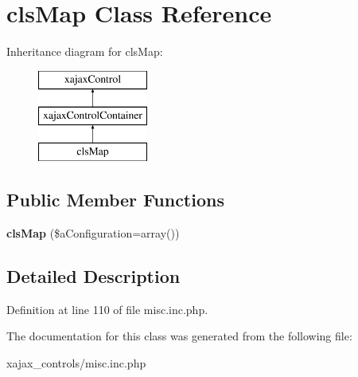 \hypertarget{classclsMap}{
\section{clsMap Class Reference}
\label{classclsMap}
}
Inheritance diagram for clsMap:\begin{figure}[H]
\begin{center}
\leavevmode
\includegraphics[height=3.000000cm]{classclsMap}
\end{center}
\end{figure}
\subsection*{Public Member Functions}
\begin{DoxyCompactItemize}
\item 
\hypertarget{classclsMap_ab8c244900e01a852ff254b9c4e9d0a10}{
{\bfseries clsMap} (\$aConfiguration=array())}
\label{classclsMap_ab8c244900e01a852ff254b9c4e9d0a10}

\end{DoxyCompactItemize}


\subsection{Detailed Description}


Definition at line 110 of file misc.inc.php.



The documentation for this class was generated from the following file:\begin{DoxyCompactItemize}
\item 
xajax\_\-controls/misc.inc.php\end{DoxyCompactItemize}

